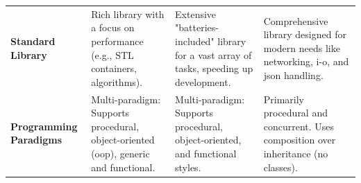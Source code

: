 \begin{table}
\begin{tabularx}{\textwidth}{
		>{\raggedright\arraybackslash}p{}
		>{\raggedright\arraybackslash}X
		>{\raggedright\arraybackslash}X
		>{\raggedright\arraybackslash}X
	}
		\textbf{Standard Library} &
		Rich library with a focus on performance (e.g., STL containers, algorithms). &
		Extensive "batteries-included" library for a vast array of tasks, speeding up development. &
		Comprehensive library designed for modern needs like networking, \gls{i-o}, and \gls{json} handling. \\
		\addlinespace
		
		\textbf{Programming Paradigms} &
		Multi-paradigm: Supports procedural, object-oriented (\gls{oop}), \gls{generic} and functional. &
		Multi-paradigm: Supports procedural, object-oriented, and functional styles. &
		Primarily procedural and concurrent. Uses composition over inheritance (no classes). \\
		\bottomrule
	\end{tabularx}
\end{table}


